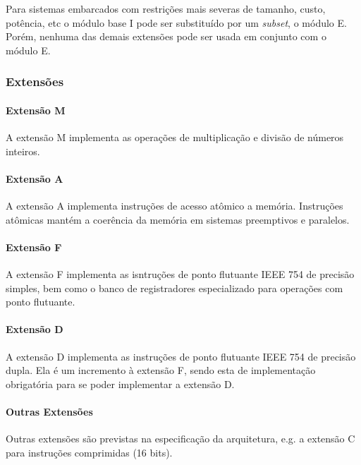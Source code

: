         { Para sistemas embarcados com restrições mais severas de tamanho, custo,
            potência, etc o módulo base I pode ser substituído por um \textit{subset},
            o módulo E. Porém, nenhuma das demais extensões pode ser usada em conjunto
            com o módulo E.
        }

        \subsubsection{Extensões}
            \paragraph{Extensão M}
            { A extensão M implementa as operações de multiplicação e divisão de
                números inteiros.
            }

            \paragraph{Extensão A}
            { A extensão A implementa instruções de acesso atômico a memória.
                Instruções atômicas mantém a coerência da memória em sistemas
                preemptivos e paralelos.
            }

            \paragraph{Extensão F}
            { A extensão F implementa as isntruções de ponto flutuante IEEE 754 de
                precisão simples, bem como o banco de registradores especializado para
                operações com ponto flutuante.
            }

            \paragraph{Extensão D}
            { A extensão D implementa as instruções de ponto flutuante IEEE 754 de
                precisão dupla. Ela é um incremento à extensão F, sendo esta de
                implementação obrigatória para se poder implementar a extensão D.
            }

            \paragraph{Outras Extensões}
            { Outras extensões são previstas na especificação da arquitetura, e.g.
                a extensão C para instruções comprimidas (16 bits).
            }

